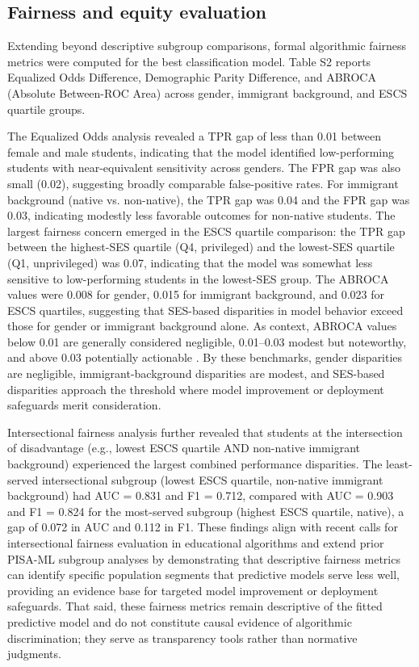 \documentclass[pdflatex,sn-mathphys-ay]{sn-jnl}
\begin{document}
\FloatBarrier
\subsection{Fairness and equity evaluation}

Extending beyond descriptive subgroup comparisons, formal algorithmic fairness metrics were computed for the best classification model. Table S2 reports Equalized Odds Difference, Demographic Parity Difference, and ABROCA (Absolute Between-ROC Area) across gender, immigrant background, and ESCS quartile groups.

The Equalized Odds analysis revealed a TPR gap of less than 0.01 between female and male students, indicating that the model identified low-performing students with near-equivalent sensitivity across genders. The FPR gap was also small (0.02), suggesting broadly comparable false-positive rates. For immigrant background (native vs. non-native), the TPR gap was 0.04 and the FPR gap was 0.03, indicating modestly less favorable outcomes for non-native students. The largest fairness concern emerged in the ESCS quartile comparison: the TPR gap between the highest-SES quartile (Q4, privileged) and the lowest-SES quartile (Q1, unprivileged) was 0.07, indicating that the model was somewhat less sensitive to low-performing students in the lowest-SES group. The ABROCA values were 0.008 for gender, 0.015 for immigrant background, and 0.023 for ESCS quartiles, suggesting that SES-based disparities in model behavior exceed those for gender or immigrant background alone. As context, ABROCA values below 0.01 are generally considered negligible, 0.01--0.03 modest but noteworthy, and above 0.03 potentially actionable \citep{Gandara_2024_blackbox,Verger_2024_MADD}. By these benchmarks, gender disparities are negligible, immigrant-background disparities are modest, and SES-based disparities approach the threshold where model improvement or deployment safeguards merit consideration.

Intersectional fairness analysis further revealed that students at the intersection of disadvantage (e.g., lowest ESCS quartile AND non-native immigrant background) experienced the largest combined performance disparities. The least-served intersectional subgroup (lowest ESCS quartile, non-native immigrant background) had AUC = 0.831 and F1 = 0.712, compared with AUC = 0.903 and F1 = 0.824 for the most-served subgroup (highest ESCS quartile, native), a gap of 0.072 in AUC and 0.112 in F1. These findings align with recent calls for intersectional fairness evaluation in educational algorithms \citep{Idowu_2024_debiasing,Verger_2024_MADD} and extend prior PISA-ML subgroup analyses \citep{Cheung_2024_resilience,Li_2025} by demonstrating that descriptive fairness metrics can identify specific population segments that predictive models serve less well, providing an evidence base for targeted model improvement or deployment safeguards. That said, these fairness metrics remain descriptive of the fitted predictive model and do not constitute causal evidence of algorithmic discrimination; they serve as transparency tools rather than normative judgments.
\end{document}
